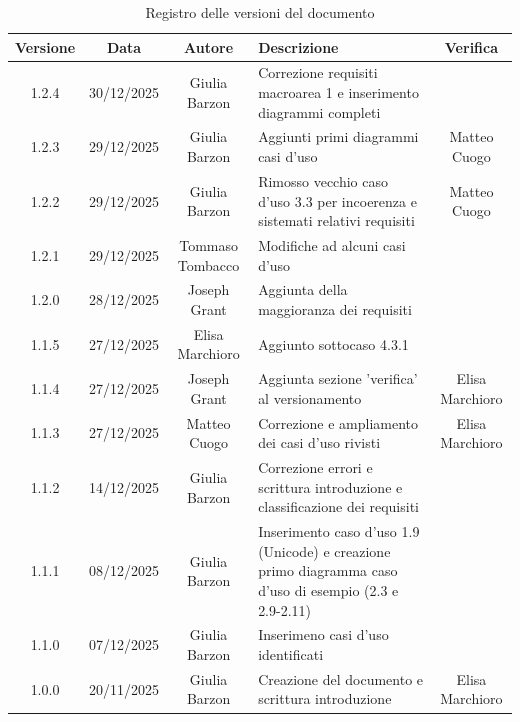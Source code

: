 \documentclass[11pt,a4paper]{article}
\begin{document}
\begin{table}[H]
    \centering
    \begin{tabular}{|c|c|c|>{\raggedright\arraybackslash}p{}|c|}
        \hline
        \textbf{Versione} & \textbf{Data} & \textbf{Autore} & \textbf{Descrizione} & \textbf{Verifica} \\
        \hline
        1.2.4 & 30/12/2025 & Giulia Barzon & Correzione requisiti macroarea 1 e inserimento diagrammi completi &  \\
        \hline
        1.2.3 & 29/12/2025 & Giulia Barzon & Aggiunti primi diagrammi casi d'uso &  Matteo Cuogo \\
        \hline
        1.2.2 & 29/12/2025 & Giulia Barzon & Rimosso vecchio caso d'uso 3.3 per incoerenza e sistemati relativi requisiti & Matteo Cuogo \\
        \hline
        1.2.1 & 29/12/2025 & Tommaso Tombacco & Modifiche ad alcuni casi d'uso &  \\ 
        \hline
        1.2.0 & 28/12/2025 & Joseph Grant & Aggiunta della maggioranza dei requisiti &  \\ 
        \hline
        1.1.5 & 27/12/2025 & Elisa Marchioro & Aggiunto sottocaso 4.3.1 & \\ 
        \hline
        1.1.4 & 27/12/2025 & Joseph Grant & Aggiunta sezione 'verifica' al versionamento & Elisa Marchioro\\ 
        \hline
        1.1.3 & 27/12/2025 & Matteo Cuogo & Correzione e ampliamento dei casi d'uso rivisti & Elisa Marchioro\\
        \hline
        1.1.2 & 14/12/2025 & Giulia Barzon & Correzione errori e scrittura introduzione e classificazione dei requisiti &\\
        \hline
        1.1.1 & 08/12/2025 & Giulia Barzon & Inserimento caso d'uso 1.9 (Unicode) e creazione primo diagramma caso d'uso di esempio (2.3 e 2.9-2.11) &\\
        \hline
        1.1.0 & 07/12/2025 & Giulia Barzon & Inserimeno casi d'uso identificati & \\
        \hline
        1.0.0 & 20/11/2025 & Giulia Barzon & Creazione del documento e scrittura introduzione & Elisa Marchioro\\
        \hline
    \end{tabular}
    \caption{Registro delle versioni del documento}
    \label{tab:versionamento}
\end{table}

\newpage
\end{document}
